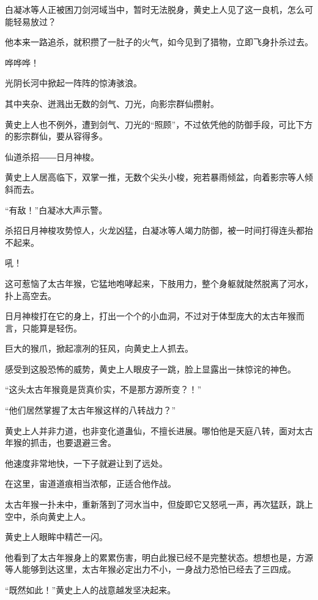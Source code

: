 
\begin{this_body}

白凝冰等人正被困刀剑河域当中，暂时无法脱身，黄史上人见了这一良机，怎么可能轻易放过？

他本来一路追杀，就积攒了一肚子的火气，如今见到了猎物，立即飞身扑杀过去。

哗哗哗！

光阴长河中掀起一阵阵的惊涛骇浪。

其中夹杂、迸溅出无数的剑气、刀光，向影宗群仙攒射。

黄史上人也不例外，遭到剑气、刀光的“照顾”，不过依凭他的防御手段，可比下方的影宗群仙，要从容得多。

仙道杀招――日月神梭。

黄史上人居高临下，双掌一推，无数个尖头小梭，宛若暴雨倾盆，向着影宗等人倾斜而去。

“有敌！”白凝冰大声示警。

杀招日月神梭攻势惊人，火龙凶猛，白凝冰等人竭力防御，被一时间打得连头都抬不起来。

吼！

这可惹恼了太古年猴，它猛地咆哮起来，下肢用力，整个身躯就陡然脱离了河水，扑上高空去。

日月神梭打在它的身上，打出一个个的小血洞，不过对于体型庞大的太古年猴而言，只能算是轻伤。

巨大的猴爪，掀起凛冽的狂风，向黄史上人抓去。

感受到这股恐怖的威势，黄史上人眼皮子一跳，脸上显露出一抹惊诧的神色。

“这头太古年猴竟是货真价实，不是那方源所变？！”

“他们居然掌握了太古年猴这样的八转战力？”

黄史上人并非力道，也非变化道蛊仙，不擅长进展。哪怕他是天庭八转，面对太古年猴的抓击，也要退避三舍。

他速度非常地快，一下子就避让到了远处。

在这里，宙道道痕相当浓郁，正适合他作战。

太古年猴一扑未中，重新落到了河水当中，但旋即它又怒吼一声，再次猛跃，跳上空中，杀向黄史上人。

黄史上人眼眸中精芒一闪。

他看到了太古年猴身上的累累伤害，明白此猴已经不是完整状态。想想也是，方源等人能够到达这里，太古年猴必定出力不小，一身战力恐怕已经去了三四成。

“既然如此！”黄史上人的战意越发坚决起来。


\end{this_body}
